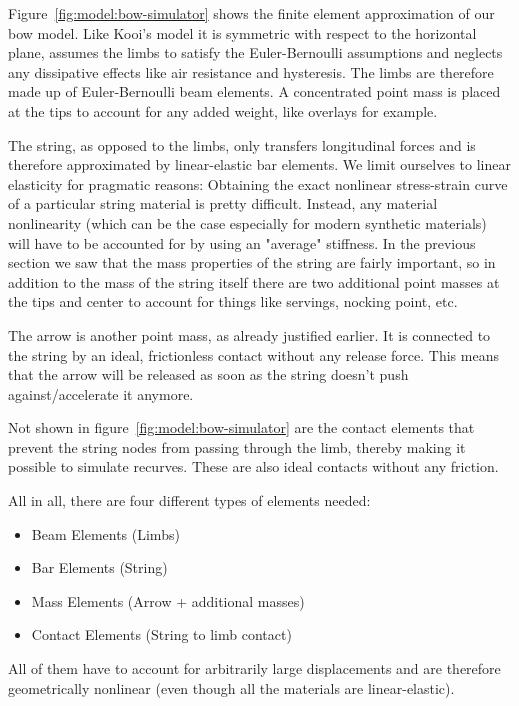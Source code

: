 Figure~\ref{fig:model:bow-simulator} shows the finite element approximation of our bow model. Like Kooi's model it is symmetric with respect to the horizontal plane, assumes the limbs to satisfy the Euler-Bernoulli assumptions and neglects any dissipative effects like air resistance and hysteresis. The limbs are therefore made up of Euler-Bernoulli beam elements. A concentrated point mass is placed at the tips to account for any added weight, like overlays for example.

The string, as opposed to the limbs, only transfers longitudinal forces and is therefore approximated by linear-elastic bar elements. We limit ourselves to linear elasticity for pragmatic reasons: Obtaining the exact nonlinear stress-strain curve of a particular string material is pretty difficult. Instead, any material nonlinearity (which can be the case especially for modern synthetic materials) will have to be accounted for by using an "average" stiffness. In the previous section we saw that the mass properties of the string are fairly important, so in addition to the mass of the string itself there are two additional point masses at the tips and center to account for things like servings, nocking point, etc.

The arrow is another point mass, as already justified earlier. It is connected to the string by an ideal, frictionless contact without any release force. This means that the arrow will be released as soon as the string doesn't push against/accelerate it anymore.

Not shown in figure~\ref{fig:model:bow-simulator} are the contact elements that prevent the string nodes from passing through the limb, thereby making it possible to simulate recurves. These are also ideal contacts without any friction.

All in all, there are four different types of elements needed:

\begin{itemize}
\item Beam Elements (Limbs)
\item Bar Elements (String)
\item Mass Elements (Arrow + additional masses)
\item Contact Elements (String to limb contact)
\end{itemize}

All of them have to account for arbitrarily large displacements and are therefore geometrically nonlinear (even though all the materials are linear-elastic).

